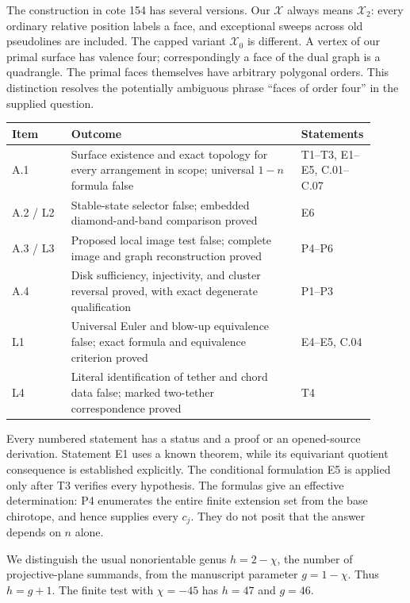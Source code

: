 \documentclass[11pt,a4paper]{article}
\begin{document}
The construction in cote 154 has several versions. Our $\mathcal X$
always means $\mathcal X_2$: every ordinary relative position labels a
face, and exceptional sweeps across old pseudolines are included.
The capped variant $\mathcal X_0$ is different. A vertex of our primal
surface has valence four; correspondingly a face of the dual graph is
a quadrangle. The primal faces themselves have arbitrary polygonal
orders. This distinction resolves the potentially ambiguous phrase
``faces of order four'' in the supplied question.

\begin{center}\small
\begin{tabular}{p{0.16\linewidth}p{0.62\linewidth}p{0.13\linewidth}}
\toprule
Item & Outcome & Statements\\\midrule
A.1 & Surface existence and exact topology for every arrangement in scope; universal $1-n$ formula false & T1--T3, E1--E5, C.01--C.07\\
A.2 / L2 & Stable-state selector false; embedded diamond-and-band comparison proved & E6\\
A.3 / L3 & Proposed local image test false; complete image and graph reconstruction proved & P4--P6\\
A.4 & Disk sufficiency, injectivity, and cluster reversal proved, with exact degenerate qualification & P1--P3\\
L1 & Universal Euler and blow-up equivalence false; exact formula and equivalence criterion proved & E4--E5, C.04\\
L4 & Literal identification of tether and chord data false; marked two-tether correspondence proved & T4\\
\bottomrule
\end{tabular}
\end{center}

Every numbered statement has a status and a proof or an opened-source
derivation. Statement E1 uses a known theorem, while its equivariant
quotient consequence is established explicitly. The conditional
formulation E5 is applied only after T3 verifies every hypothesis.
The formulas give an effective determination: P4 enumerates the entire
finite extension set from the base chirotope, and hence supplies every
$c_j$. They do not posit that the answer depends on $n$ alone.

We distinguish the usual nonorientable genus $h=2-\chi$, the number of
projective-plane summands, from the manuscript parameter $g=1-\chi$.
Thus $h=g+1$. The finite test with $\chi=-45$ has $h=47$ and $g=46$.
\end{document}
